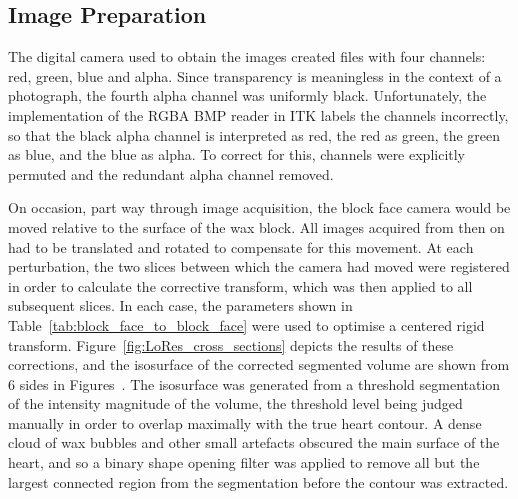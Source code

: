   \subsection{Image Preparation} %
  \label{sub:image_preparation}
  	The digital camera used to obtain the images created files with four channels: red, green, blue and alpha. Since transparency is meaningless in the context of a photograph, the fourth alpha channel was uniformly black. Unfortunately, the implementation of the RGBA BMP reader in ITK labels the channels incorrectly, so that the black alpha channel is interpreted as red, the red as green, the green as blue, and the blue as alpha. To correct for this, channels were explicitly permuted and the redundant alpha channel removed.
    
    On occasion, part way through image acquisition, the block face camera would be moved relative to the surface of the wax block. All images acquired from then on had to be translated and rotated to compensate for this movement. At each perturbation, the two slices between which the camera had moved were registered in order to calculate the corrective transform, which was then applied to all subsequent slices. In each case, the parameters shown in Table~\ref{tab:block_face_to_block_face} were used to optimise a centered rigid transform. Figure~\ref{fig:LoRes_cross_sections} depicts the results of these corrections, and the isosurface of the corrected segmented volume are shown from 6 sides in Figures~. The isosurface was generated from a threshold segmentation of the intensity magnitude of the volume, the threshold level being judged manually in order to overlap maximally with the true heart contour. A dense cloud of wax bubbles and other small artefacts obscured the main surface of the heart, and so a binary shape opening filter was applied to remove all but the largest connected region from the segmentation before the contour was extracted.
    
